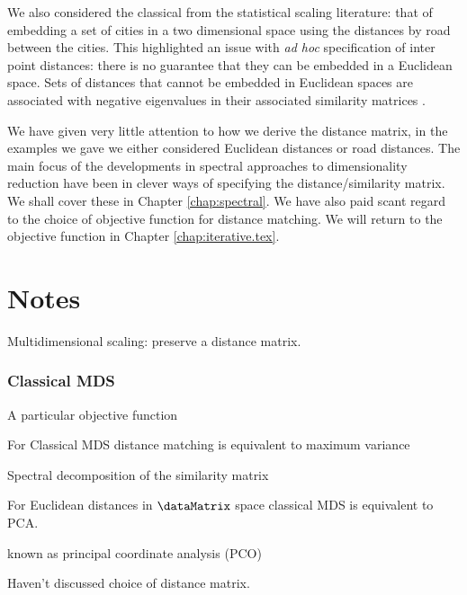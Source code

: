 We also considered the classical from the statistical scaling
literature: that of embedding a set of cities in a two dimensional
space using the distances by road between the cities. This highlighted
an issue with \emph{ad hoc} specification of inter point distances:
there is no guarantee that they can be embedded in a Euclidean
space. Sets of distances that cannot be embedded in Euclidean spaces
are associated with negative eigenvalues in their associated
similarity matrices .

We have given very little attention to how we derive the distance
matrix, in the examples we gave we either considered Euclidean
distances or road distances. The main focus of the developments in
spectral approaches to dimensionality reduction have been in clever
ways of specifying the distance/similarity matrix. We shall cover
these in Chapter \ref{chap:spectral}. We have also paid scant regard
to the choice of objective function for distance matching. We will
return to the objective function in Chapter \ref{chap:iterative.tex}.


\section{Notes}

Multidimensional scaling: preserve a distance matrix.


\subsubsection{Classical MDS}

A particular objective function

For Classical MDS distance matching is equivalent to maximum variance

Spectral decomposition of the similarity matrix

For Euclidean distances in $\dataMatrix$ space classical MDS is equivalent
to PCA. 

known as principal coordinate analysis (PCO)

Haven't discussed choice of distance matrix.


